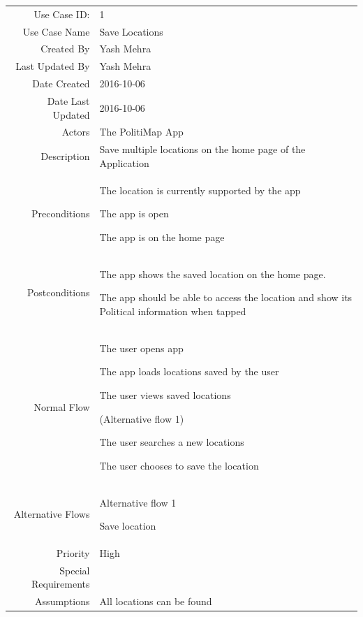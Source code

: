 \documentclass[12pt,oneside,letterpaper]{article}
\newenvironment{packed_enumerate}{
\begin{minipage}[t]{\linewidth}\begin{compactenum}[after=\strut]}
{\end{compactenum}\end{minipage}}
\begin{document}
\begin{longtable}{|r|p{3.8in}|}
\hline
Use Case ID: & 1\\
  Use Case Name & Save Locations\\
  Created By & Yash Mehra\\
  Last Updated By & Yash Mehra\\
  Date Created & 2016-10-06\\
  Date Last Updated & 2016-10-06\\
  Actors & The PolitiMap App\\
  Description & Save multiple locations on the home page of the Application\\
  Preconditions &
  \begin{packed_enumerate}
  \item The location is currently supported by the app
  \item The app is open
  \item The app is on the home page
  \end{packed_enumerate} \\
  Postconditions &
  \begin{packed_enumerate}
  \item The app shows the saved location on the home page.
  \item The app should be able to access the location and show its Political information when tapped
  \end{packed_enumerate} \\
  Normal Flow &
  \begin{packed_enumerate}
  \item The user opens app
  \item The app loads locations saved by the user
  \item The user views saved locations
  \item (Alternative flow 1)
  \item The user searches a new locations
  \item The user chooses to save the location
  \end{packed_enumerate} \\
  Alternative Flows &
  Alternative flow 1
  \begin{packed_enumerate}
  \item Save location
  \end{packed_enumerate} \\
  Priority & High\\
  Special Requirements & \\
  Assumptions & All locations can be found\\
\hline
\end{longtable}
\end{document}
